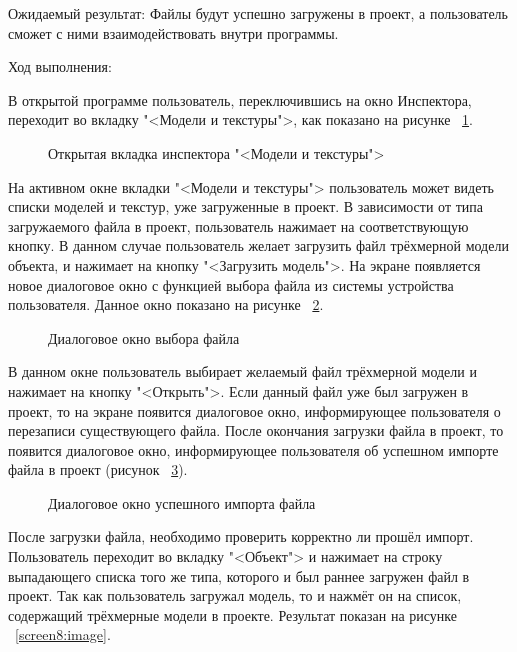Ожидаемый результат: Файлы будут успешно загружены в проект, а пользователь сможет с ними взаимодействовать внутри программы.

Ход выполнения:

В открытой программе пользователь, переключившись на окно Инспектора, переходит во вкладку "<Модели и текстуры">, как показано на рисунке ~\ref{screen5:image}.

\begin{figure}[H]
	\caption{Открытая вкладка инспектора "<Модели и текстуры">}
	\label{screen5:image}
\end{figure}

На активном окне вкладки "<Модели и текстуры"> пользователь может видеть списки моделей и текстур, уже загруженные в проект. В зависимости от типа загружаемого файла в проект, пользователь нажимает на соответствующую кнопку. В данном случае пользователь желает загрузить файл трёхмерной модели объекта, и нажимает на кнопку "<Загрузить модель">. На экране появляется новое диалоговое окно с функцией выбора файла из системы устройства пользователя. Данное окно показано на рисунке ~\ref{screen6:image}.

\begin{figure}[H]
	\caption{Диалоговое окно выбора файла}
	\label{screen6:image}
\end{figure}

В данном окне пользователь выбирает желаемый файл трёхмерной модели и нажимает на кнопку "<Открыть">. Если данный файл уже был загружен в проект, то на экране появится диалоговое окно, информирующее пользователя о перезаписи существующего файла. После окончания загрузки файла в проект, то появится диалоговое окно, информирующее пользователя об успешном импорте файла в проект (рисунок ~\ref{screen7:image}).

\begin{figure}[H]
	\caption{Диалоговое окно успешного импорта файла}
	\label{screen7:image}
\end{figure}

После загрузки файла, необходимо проверить корректно ли прошёл импорт. Пользователь переходит во вкладку "<Объект"> и нажимает на строку выпадающего списка того же типа, которого и был раннее загружен файл в проект. Так как пользователь загружал модель, то и нажмёт он на список, содержащий трёхмерные модели в проекте. Результат показан на рисунке ~\ref{screen8:image}.

